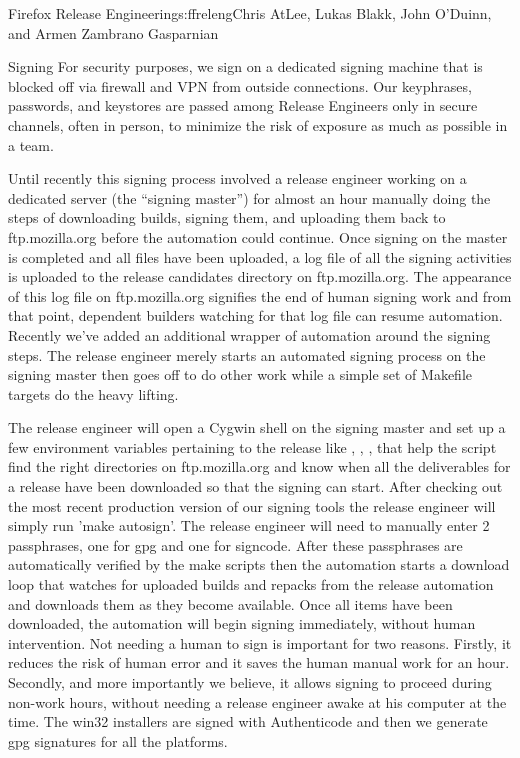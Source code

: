 \begin{aosachapter}{Firefox Release Engineering}{s:ffreleng}{Chris AtLee, Lukas Blakk, John O'Duinn, and Armen Zambrano Gasparnian}
\begin{aosasect1}{Signing}
For security purposes, we sign on a dedicated signing machine that is
blocked off via firewall and VPN from outside connections. Our
keyphrases, passwords, and keystores are passed among Release
Engineers only in secure channels, often in person, to minimize the
risk of exposure as much as possible in a team.


Until recently this signing process involved a release engineer
working on a dedicated server (the ``signing master'') for almost an
hour manually doing the steps of downloading builds, signing them, and
uploading them back to ftp.mozilla.org before the automation could
continue.  Once signing on the master is completed and all files have
been uploaded, a log file of all the signing activities is uploaded to
the release candidates directory on ftp.mozilla.org.  The appearance
of this log file on ftp.mozilla.org signifies the end of human signing
work and from that point, dependent builders watching for that log
file can resume automation.  Recently we've added an additional
wrapper of automation around the signing steps. The release engineer
merely starts an automated signing process on the signing master then
goes off to do other work while a simple set of Makefile targets do
the heavy lifting.

The release engineer will open a Cygwin shell on the signing master
and set up a few environment variables pertaining to the release like
, , ,  that
help the script find the right directories on ftp.mozilla.org and know
when all the deliverables for a release have been downloaded so that
the signing can start. After checking out the most recent production
version of our signing tools the release engineer will simply run
'make autosign'. The release engineer will need to manually enter 2
passphrases, one for gpg and one for signcode. After these passphrases
are automatically verified by the make scripts then the automation
starts a download loop that watches for uploaded builds and repacks
from the release automation and downloads them as they become
available.  Once all items have been downloaded, the automation will
begin signing immediately, without human intervention. Not needing a
human to sign is important for two reasons. Firstly, it reduces the
risk of human error and it saves the human manual work for an
hour. Secondly, and more importantly we believe, it allows signing to
proceed during non-work hours, without needing a release engineer
awake at his computer at the time.  The win32 installers are signed
with Authenticode and then we generate gpg signatures for all the
platforms.


\end{aosasect1}
\end{aosachapter}
